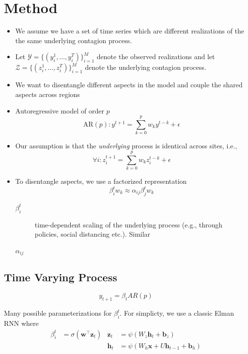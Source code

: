 \documentclass{article}
\renewcommand{\vec}[1]{\bm{#1}}
\newcommand{\Set}[1]{\mathcal{#1}}
\begin{document}
\section{Method}
\label{sec:org7821981}
\begin{itemize}
\item We assume we have a set of time series which are different realizations of the
the same underlying contagion process.
\item Let \(\Set{Y} = \{(y_i^1, \ldots, y_i^T)\}_{i=1}^M\) denote the observed
realizations and let \(\Set{Z} = \{(z_i^1, \ldots, z_i^T)\}_{i=1}^M\) denote the
underlying contagion process.
\item We want to disentangle different aspects in the model and couple the shared
aspects across regions
\item Autoregressive model of order \(p\)
\begin{equation}
  \text{AR}(p): y^{t+1} = \sum_{k=0}^p w_k y^{t-k} + \epsilon
\end{equation}
\item Our assumption is that the \emph{underlying} process is identical across sites,
i.e.,
\begin{equation}
  \forall i: z_i^{t+1} = \sum_{k=0}^p w_k z_i^{t-k} + \epsilon
\end{equation}
\item To disentangle aspects, we use a factorized representation
\begin{equation}
\beta_i^t w_k \approx \alpha_{ij }\beta_j^t w_k
\end{equation}

\begin{description}
\item[{\(\beta_i^t\)}] time-dependent scaling of the underlying process (e.g.,
through policies, social distancing etc.). Similar
\item[{\(\alpha_{ij}\)}] 
\end{description}
\end{itemize}

\subsection{Time Varying Process}
\label{sec:orgab37315}
\begin{equation*}
    y_{t+1} = \beta_t AR(p)
\end{equation*}

Many possible parameterizations for \(\beta_i^t\). For simplicty, we use a classic Elman RNN
where
\begin{align*}
    \beta_i^t & = \sigma(\vec{w}^\top \vec{z}_t)
    & \vec{z}_t & = \psi(W_z\vec{h}_t + \vec{b}_z) \\
    && \vec{h}_t & = \psi(W_h\vec{x} + U\vec{h}_{t-1} + \vec{b}_h)
\end{align*}
\end{document}
